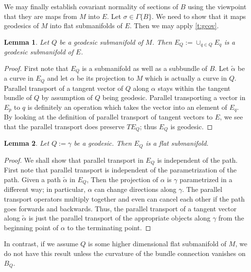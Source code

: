 \documentclass[11pt]{article}
\newtheorem{lemma}{Lemma}
\theoremstyle{remark}
\begin{document}
We may finally establish covariant normality of sections of $B$ using
the viewpoint that they are maps from $M$ into $E$. Let $\sigma \in
\ensuremath{\Gamma \{ B \}}$. We need to show that it maps geodesics of $M$ into flat
submanifolds of $E$. Then we may apply \ref{t:gcov}. 

\begin{lemma}
Let $Q$ be a geodesic submanifold of $M$. Then $E_Q \ensuremath{:=} \cup_{q
  \in Q} E_q$ is a geodesic submanifold of $E$. 
\end{lemma}

\begin{proof}
First note that $E_Q$ is a submanifold as well as a subbundle of $B$.
Let $\tilde{\alpha}$ be a curve in $E_Q$ and let $\alpha$ be its
projection to $M$ which is actually a curve in $Q$. Parallel transport
of a tangent vector of $Q$ along $\alpha$ stays within the tangent
bundle of $Q$ by assumption of $Q$ being geodesic. Parallel
transporting a vector in $E_p$ to $q$ is definitely an operation which
takes the vector into an element of $E_q$. By looking at the
definition of parallel transport of tangent vectors to $E$, we see
that the parallel transport does preserve  $T E_Q$; thus $E_Q$ is geodesic.   
\end{proof}


\begin{lemma}
Let $Q \ensuremath{:=} \gamma$ be a geodesic. Then $E_Q$ is a flat submanifold. 
\end{lemma}

\begin{proof}
We shall show that parallel transport in $E_Q$ is independent of the
path. First note that parallel transport is independent of the
parametrization of the path. Given a path $\tilde{\alpha}$ in $E_Q$,
Then the projection of $\alpha$ is $\gamma$ parametrized in a
different way; in particular, $\alpha$ can change directions along
$\gamma$. The parallel transport operators multiply together and even
can cancel each other if the path goes forwards and backwards. Thus,
the parallel transport of a tangent vector along $\tilde{\alpha}$ is
just the parallel transport of the appropriate objects along $\gamma$
from the beginning point of $\alpha$ to the terminating point.  
\end{proof}

In contrast, if we assume $Q$ is some higher dimensional flat
submanifold of $M$, we do not have this result unless the curvature of
the bundle connection vanishes on $B_Q$. 
\end{document}
